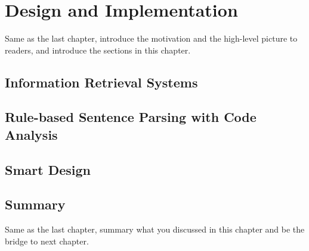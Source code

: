 \chapter{Design and Implementation}
\label{cha:design}
Same as the last chapter, introduce the motivation and the high-level picture to
readers, and introduce the sections in this chapter.

\section{Information Retrieval Systems}

\section{Rule-based Sentence Parsing with Code Analysis}

\section{Smart Design}
\label{sec:des-hotpath}

\section{Summary}
Same as the last chapter, summary what you discussed in this chapter and
be the bridge to next chapter.
